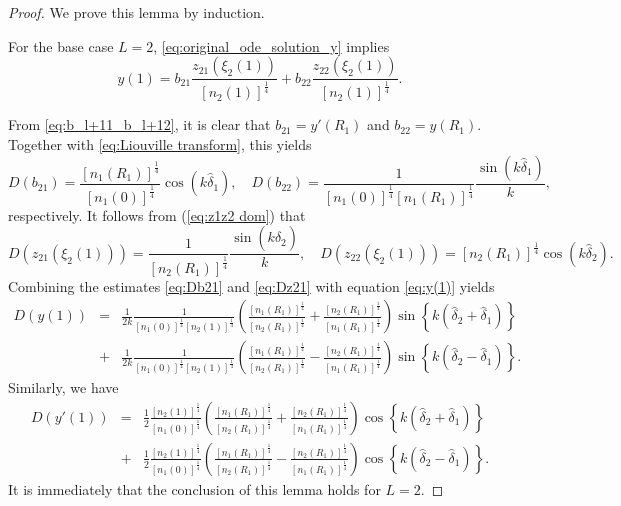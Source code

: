 \documentclass[10pt,a4paper]{amsart}
\begin{document}
\begin{proof}
We prove this lemma by induction.

For the base case $L=2$, \eqref{eq:original_ode_solution_y} implies
\begin{equation}\label{eq:y(1)}
y(1)=b_{21}\frac{z_{21}\left(\xi_2(1)\right)}{\left[n_{2}(1)\right]^{\frac{1}{4}}}+b_{22}\frac{z_{22}(\xi_2(1))}{\left[n_{2}(1)\right]^{\frac{1}{4}}}.
\end{equation}

From \eqref{eq:b_l+11_b_l+12}, it is clear that $b_{21}=y'(R_1)$ and $b_{22}=y(R_1)$. Together with \eqref{eq:Liouville transform}, this yields
\begin{equation}\label{eq:Db21}
	D(b_{21})=\frac{\left[n_1(R_1)\right]^{\frac{1}{4}}}{\left[n_1(0)\right]^{\frac{1}{4}}}\cos\left(k\hat{\delta}_1\right),\quad
	D(b_{22})=\frac{1}{\left[n_1(0)\right]^{\frac{1}{4}}\left[n_1(R_1)\right]^{\frac{1}{4}}}\frac{\sin\left(k\hat{\delta}_1\right)}{k},
\end{equation}
respectively. It follows from (\ref{eq:z1z2 dom}) that
\begin{equation}\label{eq:Dz21}
	D(z_{21}\left(\xi_2(1)\right))=\frac{1}{\left[n_{2}(R_1)\right]^{\frac{1}{4}}}\frac{\sin\left(k\hat{\delta}_2\right)}{k},\quad
	D(z_{22}\left(\xi_2(1)\right))=\left[n_{2}(R_1)\right]^{\frac{1}{4}}\cos\left(k\hat{\delta}_2\right).
\end{equation}
Combining the estimates \eqref{eq:Db21} and \eqref{eq:Dz21} with equation \eqref{eq:y(1)} yields
\begin{eqnarray*}
D(y(1))&=&\frac{1}{2k}\frac{1}{\left[n_{1}(0)\right]^{\frac{1}{4}}\left[n_{2}(1)\right]^{\frac{1}{4}}}\left(\frac{\left[n_{1}(R_1)\right]^{\frac{1}{4}}}{\left[n_{2}(R_1)\right]^{\frac{1}{4}}}+\frac{\left[n_{2}(R_1)\right]^{\frac{1}{4}}}{\left[n_{1}(R_1)\right]^{\frac{1}{4}}}\right)\sin\left\{k\left(\hat{\delta}_2+\hat{\delta}_1\right)\right\}\\
		&+&\frac{1}{2k}\frac{1}{\left[n_{1}(0)\right]^{\frac{1}{4}}\left[n_{2}(1)\right]^{\frac{1}{4}}}\left(\frac{\left[n_{1}(R_1)\right]^{\frac{1}{4}}}{\left[n_{2}(R_1)\right]^{\frac{1}{4}}}-\frac{\left[n_{2}(R_1)\right]^{\frac{1}{4}}}{\left[n_{1}(R_1)\right]^{\frac{1}{4}}}\right)\sin\left\{k\left(\hat{\delta}_2-\hat{\delta}_1\right)
		\right\}.
\end{eqnarray*}
Similarly, we have
\begin{eqnarray*}
D(y'(1))&=& \frac{1}{2}\frac{\left[n_{2}(1)\right]^{\frac{1}{4}}}{\left[n_{1}(0)\right]^{\frac{1}{4}}}\left(\frac{\left[n_{1}(R_1)\right]^{\frac{1}{4}}}{\left[n_{2}(R_1)\right]^{\frac{1}{4}}}+\frac{\left[n_{2}(R_1)\right]^{\frac{1}{4}}}{\left[n_{1}(R_1)\right]^{\frac{1}{4}}}\right)\cos\left\{k\left(\hat{\delta}_2+\hat{\delta}_1\right)\right\}\\
		&+&\frac{1}{2}\frac{\left[n_{2}(1)\right]^{\frac{1}{4}}}{\left[n_{1}(0)\right]^{\frac{1}{4}}}\left(\frac{\left[n_{1}(R_1)\right]^{\frac{1}{4}}}{\left[n_{2}(R_1)\right]^{\frac{1}{4}}}-\frac{\left[n_{2}(R_1)\right]^{\frac{1}{4}}}{\left[n_{1}(R_1)\right]^{\frac{1}{4}}}\right)\cos\left\{k\left(\hat{\delta}_2-\hat{\delta}_1\right)\right\}.
\end{eqnarray*}
It is immediately that the conclusion of this lemma holds for $L=2$.


\end{proof}
\end{document}
